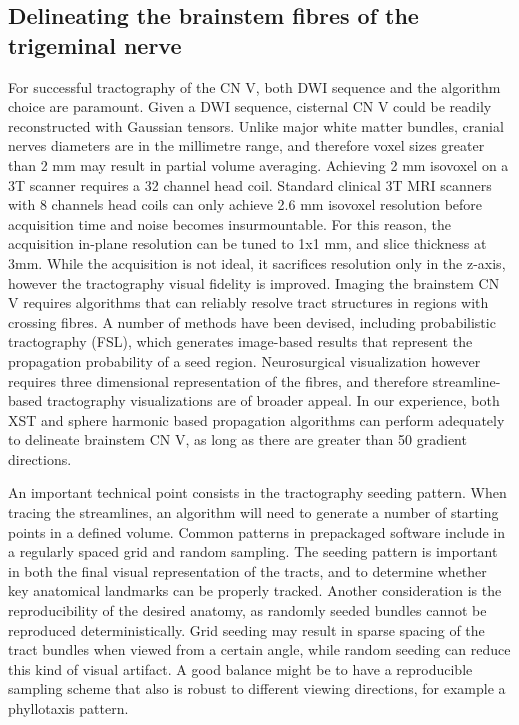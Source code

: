 \subsection{Delineating the brainstem fibres of the trigeminal nerve}

For successful tractography of the CN V, both DWI sequence and the algorithm choice are paramount. Given a DWI sequence, cisternal CN V could be readily reconstructed with Gaussian tensors. Unlike major white matter bundles, cranial nerves diameters are in the millimetre range, and therefore voxel sizes greater than 2 mm may result in partial volume averaging. Achieving 2 mm isovoxel on a 3T scanner requires a 32 channel head coil. Standard clinical 3T MRI scanners with 8 channels head coils can only achieve 2.6 mm isovoxel resolution before acquisition time and noise becomes insurmountable. For this reason, the acquisition in-plane resolution can be tuned to 1x1 mm, and slice thickness at 3mm. While the acquisition is not ideal, it sacrifices resolution only in the z-axis, however the tractography visual fidelity is improved. 
Imaging the brainstem CN V requires algorithms that can reliably resolve tract structures in regions with crossing fibres. A number of methods have been devised, including probabilistic tractography (FSL)\cite{Behrens2007}, which generates image-based results that represent the propagation probability of a seed region. Neurosurgical visualization however requires three dimensional representation of the fibres, and therefore streamline-based tractography visualizations are of broader appeal. In our experience, both XST and sphere harmonic based propagation algorithms can perform adequately to delineate brainstem CN V, as long as there are greater than 50 gradient directions. 

An important technical point consists in the tractography seeding pattern. When tracing the streamlines, an algorithm will need to generate a number of starting points in a defined volume. Common patterns in prepackaged software include in a regularly spaced grid and random sampling. The seeding pattern is important in both the final visual representation of the tracts, and to determine whether key anatomical landmarks can be properly tracked. Another consideration is the reproducibility of the desired anatomy, as randomly seeded bundles cannot be reproduced deterministically. Grid seeding may result in sparse spacing of the tract bundles when viewed from a certain angle, while random seeding can reduce this kind of visual artifact. A good balance might be to have a reproducible sampling scheme that also is robust to different viewing directions, for example a phyllotaxis pattern.

